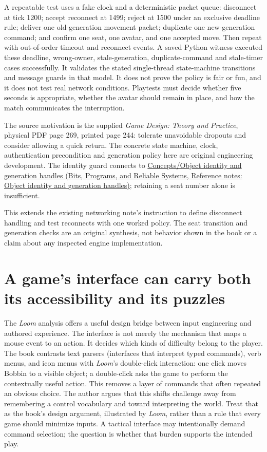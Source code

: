 A repeatable test uses a fake clock and a deterministic packet queue: disconnect at tick 1200; accept reconnect at 1499; reject at 1500 under an exclusive deadline rule; deliver one old-generation movement packet; duplicate one new-generation command; and confirm one seat, one avatar, and one accepted move. Then repeat with out-of-order timeout and reconnect events. A saved Python witness executed these deadline, wrong-owner, stale-generation, duplicate-command and stale-timer cases successfully. It validates the stated single-thread state-machine transitions and message guards in that model. It does not prove the policy is fair or fun, and it does not test real network conditions. Playtests must decide whether five seconds is appropriate, whether the avatar should remain in place, and how the match communicates the interruption.

The source motivation is the supplied \emph{Game Design: Theory and Practice}, physical PDF page 269, printed page 244: tolerate unavoidable dropouts and consider allowing a quick return. The concrete state machine, clock, authentication precondition and generation policy here are original engineering development. The identity guard connects to \href{../01-Bits-Programs-and-Reliable-Systems/main.pdf\#nameddest=appendix-f1581457d322}{Concepts/Object identity and generation handles (Bits, Programs, and Reliable Systems, Reference notes: Object identity and generation handles)}; retaining a seat number alone is insufficient.

This extends the existing networking note's instruction to define disconnect handling and test reconnects with one worked policy. The seat transition and generation checks are an original synthesis, not behavior shown in the book or a claim about any inspected engine implementation.

\section{A game's interface can carry both its accessibility and its puzzles}\label{06-engine-ii-ch047-a-games-interface-can-carry-both-its-accessibility-and-its-puzzles}

The \emph{Loom} analysis offers a useful design bridge between input engineering and authored experience. The interface is not merely the mechanism that maps a mouse event to an action. It decides which kinds of difficulty belong to the player. The book contrasts text parsers (interfaces that interpret typed commands), verb menus, and icon menus with \emph{Loom}'s double-click interaction: one click moves Bobbin to a visible object; a double-click asks the game to perform the contextually useful action. This removes a layer of commands that often repeated an obvious choice. The author argues that this shifts challenge away from remembering a control vocabulary and toward interpreting the world. Treat that as the book's design argument, illustrated by \emph{Loom}, rather than a rule that every game should minimize inputs. A tactical interface may intentionally demand command selection; the question is whether that burden supports the intended play.

